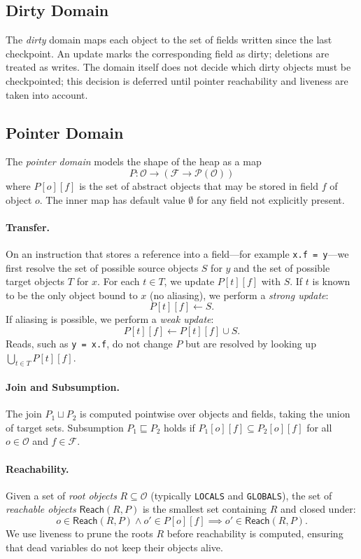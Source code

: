 \subsection{Dirty Domain}
The \emph{dirty} domain maps each object to the set of fields written since the last checkpoint.
An update marks the corresponding field as dirty; deletions are treated as writes.
The domain itself does not decide which dirty objects must be checkpointed; this decision is deferred until pointer reachability and liveness are taken into account.
\subsection{Pointer Domain}
The \emph{pointer domain} models the shape of the heap as a map
\[
P : \mathcal{O} \to (\mathcal{F} \to \mathcal{P}(\mathcal{O}))
\]
where $P[o][f]$ is the set of abstract objects that may be stored in field $f$ of object $o$.
The inner map has default value $\emptyset$ for any field not explicitly present.

\paragraph{Transfer.}
On an instruction that stores a reference into a field---for example \texttt{x.f = y}---we first resolve the set of possible source objects $S$ for $y$ and the set of possible target objects $T$ for $x$.
For each $t \in T$, we update $P[t][f]$ with $S$.
If $t$ is known to be the only object bound to $x$ (no aliasing), we perform a \emph{strong update}:
\[
P[t][f] \leftarrow S.
\]
If aliasing is possible, we perform a \emph{weak update}:
\[
P[t][f] \leftarrow P[t][f] \cup S.
\]
Reads, such as \texttt{y = x.f}, do not change $P$ but are resolved by looking up $\bigcup_{t \in T} P[t][f]$.

\paragraph{Join and Subsumption.}
The join $P_1 \sqcup P_2$ is computed pointwise over objects and fields, taking the union of target sets.
Subsumption $P_1 \sqsubseteq P_2$ holds if $P_1[o][f] \subseteq P_2[o][f]$ for all $o \in \mathcal{O}$ and $f \in \mathcal{F}$.

\paragraph{Reachability.}
Given a set of \emph{root objects} $R \subseteq \mathcal{O}$ (typically \texttt{LOCALS} and \texttt{GLOBALS}), the set of \emph{reachable objects} $\mathsf{Reach}(R, P)$ is the smallest set containing $R$ and closed under:
\[
o \in \mathsf{Reach}(R, P) \wedge o' \in P[o][f] \implies o' \in \mathsf{Reach}(R, P).
\]
We use liveness to prune the roots $R$ before reachability is computed, ensuring that dead variables do not keep their objects alive.

